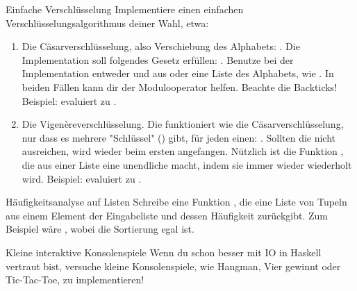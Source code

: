 \documentclass{uebblatt}
\begin{document}
\begin{aufgabe}{Einfache Verschlüsselung}
	Implementiere einen einfachen Verschlüsselungsalgorithmus deiner Wahl, etwa:
	\begin{enumerate}
		\item Die Cäsarverschlüsselung, also Verschiebung des Alphabets: . Die Implementation soll folgendes Gesetz erfüllen: .
            Benutze bei der Implementation entweder  und  aus  oder eine Liste des Alphabets, wie \haskellinline{['A'..'Z'] ++ ['a'..'z'] :: [Char]}. In beiden Fällen kann dir der Modulooperator  helfen. Beachte die Backticks! Beispiel:  evaluiert zu .
        \item Die Vigenèreverschlüsselung. Die funktioniert wie die Cäsarverschlüsselung, nur dass es mehrere "Schlüssel" () gibt, für jeden  einen: . Sollten die  nicht ausreichen, wird wieder beim ersten angefangen. Nützlich ist die Funktion , die aus einer Liste eine unendliche macht, indem sie immer wieder wiederholt wird. Beispiel:  evaluiert zu .
	\end{enumerate}
\end{aufgabe}

\begin{aufgabe}{Häufigkeitsanalyse auf Listen}
	Schreibe eine Funktion , die eine Liste von Tupeln aus einem Element der Eingabeliste und dessen Häufigkeit zurückgibt. Zum Beispiel wäre , wobei die Sortierung egal ist.
\end{aufgabe}

\begin{aufgabe}{Kleine interaktive Konsolenspiele}
Wenn du schon besser mit IO in Haskell vertraut bist, versuche kleine Konsolenspiele, wie Hangman, Vier gewinnt oder Tic-Tac-Toe, zu implementieren!
\end{aufgabe}
\end{document}
